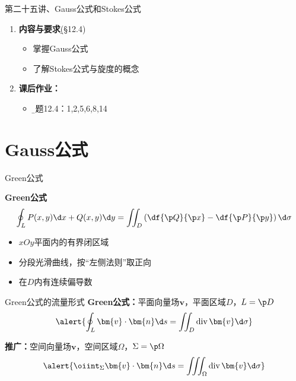 
\begin{frame}{第二十五讲、Gauss公式和Stokes公式}
	\linespread{1.5}
	\begin{enumerate}
	  \item {\bf 内容与要求}{\b (\S 12.4)}
	  \begin{itemize}
		\item 掌握Gauss公式
		\item 了解Stokes公式与旋度的概念
	  \vspace{1em}
	  \end{itemize}
	  \item {\bf  课后作业：}
	  \begin{itemize}
	    \item {\b 习题12.4：1,2,5,6,8,14}
	  \end{itemize}
	\end{enumerate}
\end{frame}

\section{Gauss公式}

\begin{frame}{Green公式}
	\linespread{1.2}\pause
	\begin{block}{{\bf Green公式}\hfill}
		$$\oint_LP(x,y)\d x+Q(x,y)\d y=\iint_D\left(
		\df{\p Q}{\p x}-\df{\p P}{\p y}\right)\d\sigma $$
	\end{block}\pause
	\begin{itemize}
	  \item {}$xOy$平面内的\alert{有界闭区域}\pause
	  \item {}分段光滑曲线，按\alert{“左侧法则”}取正向\pause
	  \item {}在$D$内有连续偏导数
	\end{itemize}
\end{frame}

\begin{frame}{Green公式的流量形式}
	\linespread{1.2}\pause
	{\bf Green公式：}平面向量场$\bm{v}$，平面区域$D$，$L=\p D$\pause
	$$\alert{\oint_L\bm{v}\cdot\bm{n}\d s=\iint_D\mathrm{div}\,\bm{v}\d\sigma}$$
	\bigskip\pause
	
	{\bf 推广：}空间向量场$\bm{v}$，\pause 空间区域$\Omega$，\pause $\Sigma=\p\Omega$\pause
	$$\alert{\oiint_{\Sigma}\bm{v}\cdot\bm{n}\d
	s=\iiint_{\Omega}\mathrm{div}\,\bm{v}\d\sigma}$$
\end{frame}


